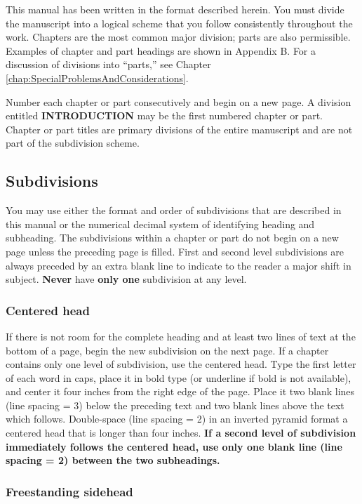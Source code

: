 This manual has been written in the format described here\-in. You
must divide the man\-u\-script into a logical scheme that you follow
consistently throughout the work. Chapters are the most common major
division; parts are also permissible. Examples of chapter and part
headings are shown in Appendix B. For a discussion of divisions into
``parts,'' see Chapter \ref{chap:SpecialProblemsAndConsiderations}.

Number each chapter or part consecutively and begin on a new page. A
division entitled \textbf{INTRODUCTION} may be the first numbered
chapter or part. Chapter or part titles are primary divisions of the
entire manuscript and are not part of the subdivision scheme.

\subsection{Subdivisions}
\label{sec:Subdivisions}

You may use either the format and order of subdivisions that are
described in this manual or the numerical decimal system of
identifying heading and subheading. The subdivisions within a chapter
or part do not begin on a new page unless the preceding page is
filled. First and second level subdivisions are always preceded by an
extra blank line to indicate to the reader a major shift in subject.
\textbf{Never} have \textbf{only one} subdivision at any level.

\subsubsection{Centered head}
\label{sec:CenteredHead}

If there is not room for the complete heading and at least two lines
of text at the bottom of a page, begin the new subdivision on the next
page. If a chapter contains only one level of subdivision, use the
centered head. Type the first letter of each word in caps, place it in
bold type (or underline if bold is not available), and center it four
inches from the right edge of the page. Place it two blank lines (line
spacing = 3) below the preceding text and two blank lines above the
text which follows. Double-space (line spacing = 2) in an inverted
pyramid format a centered head that is longer than four inches.
\textbf{If a second level of subdivision immediately follows the
  centered head, use only one blank line (line spacing = 2) between
  the two subheadings.}

\subsubsection{Freestanding sidehead}
\label{sec:FreestandingSideHead}

